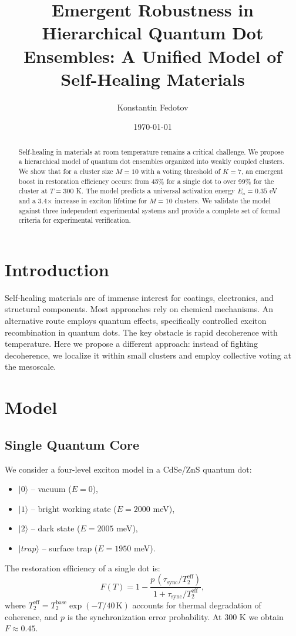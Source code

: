 \documentclass[12pt]{article}
\title{Emergent Robustness in Hierarchical Quantum Dot Ensembles: A Unified Model of Self-Healing Materials}
\author{Konstantin Fedotov}
\date{\today}
\begin{document}
\maketitle

\begin{abstract}
Self-healing in materials at room temperature remains a critical challenge. We propose a hierarchical model of quantum dot ensembles organized into weakly coupled clusters. We show that for a cluster size $M=10$ with a voting threshold of $K=7$, an emergent boost in restoration efficiency occurs: from 45\% for a single dot to over 99\% for the cluster at $T=300$ K. The model predicts a universal activation energy $E_a = 0.35$ eV and a 3.4$\times$ increase in exciton lifetime for $M=10$ clusters. We validate the model against three independent experimental systems and provide a complete set of formal criteria for experimental verification.
\end{abstract}

\section{Introduction}
Self-healing materials are of immense interest for coatings, electronics, and structural components. Most approaches rely on chemical mechanisms. An alternative route employs quantum effects, specifically controlled exciton recombination in quantum dots. The key obstacle is rapid decoherence with temperature. Here we propose a different approach: instead of fighting decoherence, we localize it within small clusters and employ collective voting at the mesoscale.

\section{Model}
\subsection{Single Quantum Core}
We consider a four-level exciton model in a CdSe/ZnS quantum dot:
\begin{itemize}
    \item $|0\rangle$ -- vacuum ($E=0$),
    \item $|1\rangle$ -- bright working state ($E=2000$ meV),
    \item $|2\rangle$ -- dark state ($E=2005$ meV),
    \item $|trap\rangle$ -- surface trap ($E=1950$ meV).
\end{itemize}
The restoration efficiency of a single dot is:
\begin{equation}
F(T) = 1 - \frac{p \, (\tau_{\text{sync}}/T_2^{\text{eff}})}{1 + \tau_{\text{sync}}/T_2^{\text{eff}}},
\end{equation}
where $T_2^{\text{eff}} = T_2^{\text{base}} \exp(-T/40\,\text{K})$ accounts for thermal degradation of coherence, and $p$ is the synchronization error probability. At 300 K we obtain $F \approx 0.45$.
\end{document}
